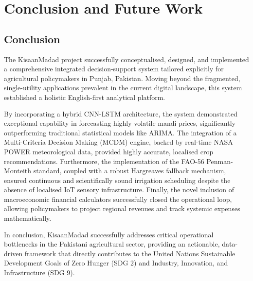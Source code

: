 \chapter{Conclusion and Future Work}

\section{Conclusion}
The KisaanMadad project successfully conceptualised, designed, and implemented a comprehensive integrated decision-support system tailored explicitly for agricultural policymakers in Punjab, Pakistan. Moving beyond the fragmented, single-utility applications prevalent in the current digital landscape, this system established a holistic English-first analytical platform.

By incorporating a hybrid CNN-LSTM architecture, the system demonstrated exceptional capability in forecasting highly volatile mandi prices, significantly outperforming traditional statistical models like ARIMA. The integration of a Multi-Criteria Decision Making (MCDM) engine, backed by real-time NASA POWER meteorological data, provided highly accurate, localised crop recommendations. Furthermore, the implementation of the FAO-56 Penman-Monteith standard, coupled with a robust Hargreaves fallback mechanism, ensured continuous and scientifically sound irrigation scheduling despite the absence of localised IoT sensory infrastructure. Finally, the novel inclusion of macroeconomic financial calculators successfully closed the operational loop, allowing policymakers to project regional revenues and track systemic expenses mathematically.

In conclusion, KisaanMadad successfully addresses critical operational bottlenecks in the Pakistani agricultural sector, providing an actionable, data-driven framework that directly contributes to the United Nations Sustainable Development Goals of Zero Hunger (SDG 2) and Industry, Innovation, and Infrastructure (SDG 9).

